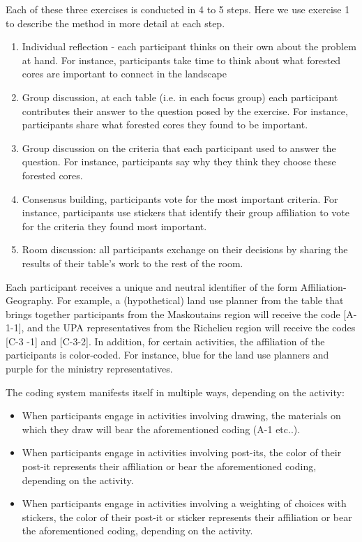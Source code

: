 Each of these three exercises is conducted in 4 to 5 steps. Here we use exercise 1 to describe the method in more detail at each step.

\begin{enumerate}
\item Individual reflection - each participant thinks on their own about the problem at hand. For instance, participants take time to think about what forested cores are important to connect in the landscape
\item Group discussion, at each table (i.e. in each focus group) each participant contributes their answer to the question posed by the exercise. For instance, participants share what forested cores they found to be important.
\item Group discussion on the criteria that each participant used to answer the question. For instance, participants say why they think they choose these forested cores.
\item Consensus building, participants vote for the most important criteria. For instance, participants use stickers that identify their group affiliation to vote for the criteria they found most important.
\item Room discussion: all participants exchange on their decisions by sharing the results of their table’s work to the rest of the room.
\end{enumerate}

Each participant receives a unique and neutral identifier of the form Affiliation-Geography. For example, a (hypothetical) land use planner from the table that brings together participants from the Maskoutains region will receive the code [A-1-1], and the UPA representatives from the Richelieu region will receive the codes [C-3 -1] and [C-3-2]. In addition, for certain activities, the affiliation of the participants is color-coded. For instance, blue for the land use planners and purple for the ministry representatives.

The coding system manifests itself in multiple ways, depending on the activity:
\begin{itemize}
\item When participants engage in activities involving drawing, the materials on which they draw will bear the aforementioned coding (A-1 etc..).
\item When participants engage in activities involving post-its, the color of their post-it represents their affiliation or bear the aforementioned coding, depending on the activity.
\item When participants engage in activities involving a weighting of choices with stickers, the color of their post-it or sticker represents their affiliation or bear the aforementioned coding, depending on the activity.
\end{itemize}

